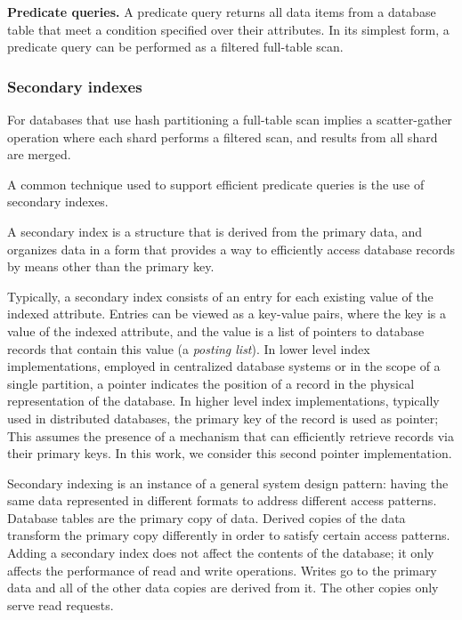 \bigskip
\noindent
\textbf{Predicate queries.}
A predicate query returns all data items from a database table that meet a condition specified over their attributes.
In its simplest form, a predicate query can be performed as a filtered full-table scan.

\subsubsection{Secondary indexes}
\label{sec:secondary_indexes}
For databases that use hash partitioning a full-table scan implies a scatter-gather operation where each shard
performs a filtered scan, and results from all shard are merged.

A common technique used to support efficient predicate queries is the use of secondary indexes.

A secondary index is a structure that is derived from the primary data, and organizes data in a form that
provides a way to efficiently access database records by means other than the primary key.

Typically, a secondary index consists of an entry for each existing value of the indexed attribute.
Entries can be viewed as a key-value pairs,
where the key is a value of the indexed attribute,
and the value is a list of pointers to database records that contain this value (a \textit{posting list}).
In lower level index implementations, employed in centralized database systems
or in the scope of a single partition, a pointer indicates the position of a record in the physical representation
of the database.
In higher level index implementations, typically used in distributed databases, the primary key of the record is used as pointer;
This assumes the presence of a mechanism that can efficiently retrieve records via their primary keys.
In this work, we consider this second pointer implementation.

\medskip
\noindent
Secondary indexing is an instance of a general system design pattern:
having the same data represented in different formats to address different access patterns.
Database tables are the primary copy of data.
Derived copies of the data transform the primary copy differently in order to satisfy certain access patterns.
Adding a secondary index does not affect the contents of the database;
it only affects the performance of read and write operations.
Writes go to the primary data and all of the other data copies are derived from it.
The other copies only serve read requests.

